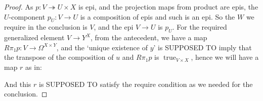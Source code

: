 \documentclass[a4paper]{article}
\DeclareMathOperator{\true}{\text {true}}
\begin{document}
\begin{proof}
    As $p:V\twoheadrightarrow U\times X$ is epi, and the projection maps from product are epis, the $U$-component $p_U:V\to U$ is a composition of epis and such is an epi. So the $W$ we require in the conclusion is $V$, and the epi $V\to U$ is $p_U$. For the required generalized element $V\to Y^X$, from the antecedent, we have a map $R\pi_1p:V\to \Omega^{X\times Y}$, and the `unique existence of $y$' is SUPPOSED TO imply that the transpose of the composition of $u$ and $R\pi_1p$ is $\true_{V\times X}$, hence we will have a map $r$ as in:

    \begin{center}
    \end{center}

    And this $r$ is SUPPOSED TO satisfy the require condition as we needed for the conclusion.










\end{proof}
\end{document}
